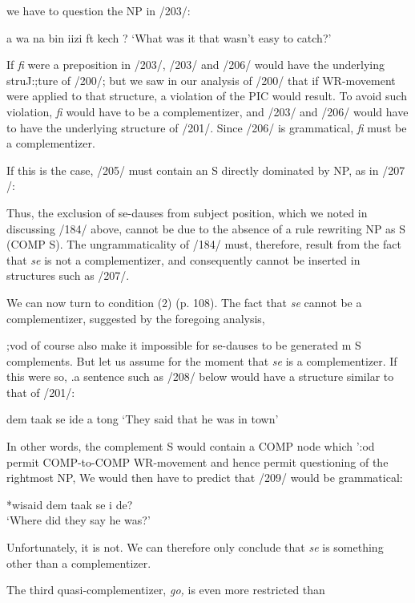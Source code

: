 we have to question the NP in /203/:

\ea\label{ex:2:206}
 a wa na bin iizi ft kech ?
\glt `What was it that wasn't easy to catch?'
\z



If \textit{fi} were a preposition in /203/, /203/ and /206/ would have the under\-lying struJ:;ture of /200/; but we saw in our analysis of /200/ that if WR-movement were applied to that structure, a violation of the PIC
would result. To avoid such violation, \textit{fi} would have to be a complementizer, and /203/ and /206/ would have to have the underlying structure of /201/. Since /206/ is grammatical, \textit{fi} must be a complementizer.

If this is the case, /205/ must contain an S directly dominated by NP, as in /207 /:

Thus, the exclusion of se-dauses from subject position, which we noted in discussing /184/ above, cannot be due to the absence of a rule rewriting NP as S (COMP S). The ungrammaticality of /184/ must, therefore, result from the fact that \textit{se} is not a complementizer, and consequently cannot be inserted in structures such as /207/.

We can now turn to condition (2) (p. 108). The fact that \textit{se}
cannot be a complementizer, suggested by the foregoing analysis,

;vod of course also make it impossible for se-dauses to be generated m S complements. But let us assume for the moment that \textit{se} is a com\-plementizer. If this were so, .a sentence such as /208/ below would have a structure similar to that of /201/:

\ea\label{ex:2:208}
 dem taak se ide a tong
\glt `They said that he was in town'
\z



In other words, the complement S would contain a COMP node which ':od permit COMP-to-COMP WR-movement and hence permit questioning of the rightmost NP, We would then have to predict that /209/
 would be grammatical:


\ea\label{ex:2:209}
*wisaid dem taak se i de? \\
\glt `Where did they say he was?'
\z

Unfortunately, it is not. We can therefore only conclude that \textit{se }is something other than a complementizer.

The third quasi-complementizer, \textit{go,} is even more restricted than

